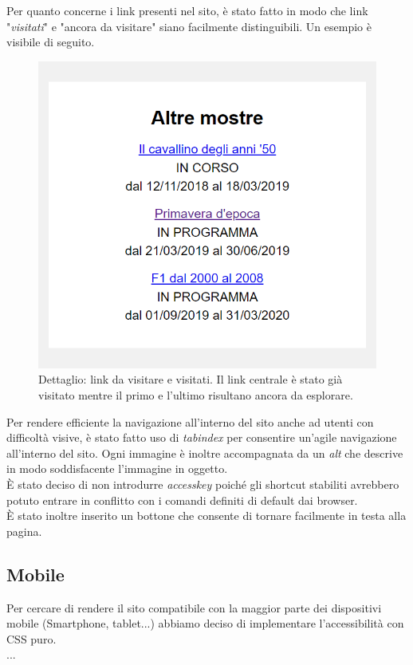 Per quanto concerne i link presenti nel sito, è stato fatto in modo che link "\textit{visitati}" e "ancora da visitare" siano facilmente distinguibili. Un esempio è visibile di seguito.
\begin{figure}[h]
	\begin{center}
		\includegraphics[scale=1.5]{Images/linkVisitatiDaVisitare.png}
		\caption{Dettaglio: link da visitare e visitati. Il link centrale è stato già visitato mentre il primo e l'ultimo risultano ancora da esplorare.}
	\end{center}
\end{figure}

Per rendere efficiente la navigazione all'interno del sito anche ad utenti con difficoltà visive, è stato fatto uso di \textit{tabindex} per consentire un'agile navigazione all'interno del sito. Ogni immagine è inoltre accompagnata da un \textit{alt} che descrive in modo soddisfacente l'immagine in oggetto.\\
È stato deciso di non introdurre \textit{accesskey} poiché gli shortcut stabiliti avrebbero potuto entrare in conflitto con i comandi definiti di default dai browser.\\
È stato inoltre inserito un bottone che consente di tornare facilmente in testa alla pagina.

\subsection{Mobile}
Per cercare di rendere il sito compatibile con la maggior parte dei dispositivi mobile (Smartphone, tablet...)
abbiamo deciso di implementare l'accessibilità con CSS puro.
\\ ...

